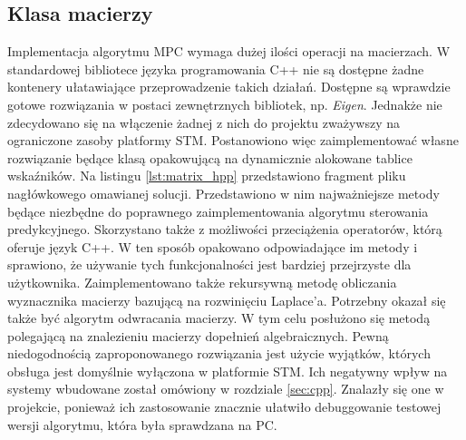 \subsection{Klasa macierzy} \label{sec:matrices}
Implementacja algorytmu MPC wymaga dużej ilości operacji na macierzach. W standardowej bibliotece języka
programowania C++ nie są dostępne żadne kontenery ułatawiające przeprowadzenie takich działań. Dostępne
są wprawdzie gotowe rozwiązania w postaci zewnętrznych bibliotek, np. \textit{Eigen}. Jednakże nie
zdecydowano się na włączenie żadnej z nich do projektu zważywszy na ograniczone zasoby platformy STM.
Postanowiono więc zaimplementować własne rozwiązanie będące klasą opakowującą na dynamicznie alokowane
tablice wskaźników. Na listingu \ref{lst:matrix_hpp} przedstawiono fragment pliku nagłówkowego omawianej
solucji. Przedstawiono w nim najważniejsze metody będące niezbędne do poprawnego zaimplementowania 
algorytmu sterowania predykcyjnego. Skorzystano także z możliwości przeciążenia operatorów, którą oferuje
język C++. W ten sposób opakowano odpowiadające im metody i sprawiono, że używanie tych funkcjonalności
jest bardziej przejrzyste dla użytkownika. Zaimplementowano także rekursywną metodę obliczania wyznacznika
macierzy bazującą na rozwinięciu Laplace'a. Potrzebny okazał się także być algorytm odwracania macierzy.
W tym celu posłużono się metodą polegającą na znalezieniu macierzy dopełnień algebraicznych. Pewną
niedogodnością zaproponowanego rozwiązania jest użycie wyjątków, których obsługa jest domyślnie wyłączona
w platformie STM. Ich negatywny wpływ na systemy wbudowane został omówiony w rozdziale \ref{sec:cpp}.
Znalazły się one w projekcie, ponieważ ich zastosowanie znacznie ułatwiło debuggowanie testowej wersji
algorytmu, która była sprawdzana na PC.  
